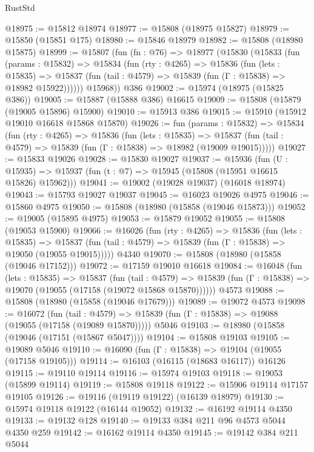 \begin{lexlean}{RustStd}
\begin{coremodule}
@18975 := @15812 @18974
@18977 := @15808 (@18975 @15827)
@18979 := @15850 (@15851 @175)
@18980 := @15846 @18979
@18982 := @15808 (@18980 @15875)
@18999 := @15807
    (fun (fn : @76) =>
    @18977
      (@15830
        (@15833
          (fun (params : @15832) =>
          @15834
            (fun (rty : @4265) =>
            @15836
              (fun (lets : @15835) =>
              @15837 (fun (tail : @4579) => @15839 (fun (Γ : @15838) => @18982 @15922))))))
        @15968))
    @386
@19002 := @15974 (@18975 (@15825 @386))
@19005 := @15887 (@15888 @386) @16615
@19009 := @15808 (@15879 (@19005 @15896) @15900)
@19010 := @15913 @386
@19015 := @15910 (@15912 @19010 @16618 @15868 @15870)
@19026 := fun (params : @15832) =>
  @15834
    (fun (rty : @4265) =>
    @15836
      (fun (lets : @15835) =>
      @15837 (fun (tail : @4579) => @15839 (fun (Γ : @15838) => @18982 (@19009 @19015)))))
@19027 := @15833 @19026
@19028 := @15830 @19027
@19037 := @15936
    (fun (U : @15935) => @15937 (fun (t : @7) => @15945 (@15808 (@15951 @16615 @15826) @15962)))
@19041 := @19002 (@19028 @19037) (@16018 @18974)
@19043 := @15793 @19027 @19037
@19045 := @16023 @19026 @4975
@19046 := @15860 @4975
@19050 := @15808 (@18980 (@15858 (@19046 @15873)))
@19052 := @19005 (@15895 @4975)
@19053 := @15879 @19052
@19055 := @15808 (@19053 @15900)
@19066 := @16026
    (fun (rty : @4265) =>
    @15836
      (fun (lets : @15835) =>
      @15837 (fun (tail : @4579) => @15839 (fun (Γ : @15838) => @19050 (@19055 @19015)))))
    @4340
@19070 := @15808 (@18980 (@15858 (@19046 @17152)))
@19072 := @17159 @19010 @16618
@19084 := @16048
    (fun (lets : @15835) =>
    @15837
      (fun (tail : @4579) =>
      @15839 (fun (Γ : @15838) => @19070 (@19055 (@17158 (@19072 @15868 @15870))))))
    @4573
@19088 := @15808 (@18980 (@15858 (@19046 @17679)))
@19089 := @19072 @4573
@19098 := @16072
    (fun (tail : @4579) => @15839 (fun (Γ : @15838) => @19088 (@19055 (@17158 (@19089 @15870)))))
    @5046
@19103 := @18980 (@15858 (@19046 (@17151 (@15867 @5047))))
@19104 := @15808 @19103
@19105 := @19089 @5046
@19110 := @16090 (fun (Γ : @15838) => @19104 (@19055 (@17158 @19105)))
@19114 := @16103 (@16115 (@18683 @16117)) @16126
@19115 := @19110 @19114
@19116 := @15974 @19103
@19118 := @19053 (@15899 @19114)
@19119 := @15808 @19118
@19122 := @15906 @19114 @17157 @19105
@19126 := @19116 (@19119 @19122) (@16139 @18979)
@19130 := @15974 @19118 @19122 (@16144 @19052)
@19132 := @16192 @19114 @4350
@19133 := @19132 @128
@19140 := @19133 @384 @211 @96 @4573 @5044 @4350 @259
@19142 := @16162 @19114 @4350
@19145 := @19142 @384 @211 @5044

\end{coremodule}
\end{lexlean}
